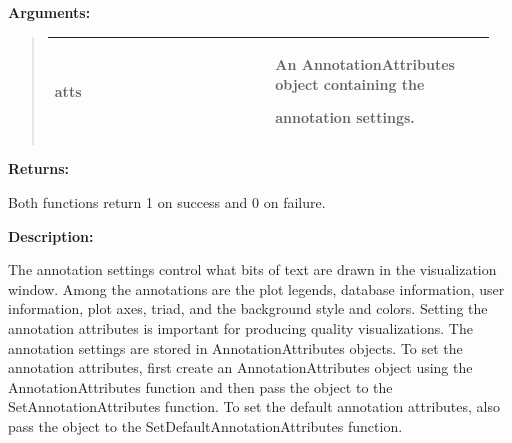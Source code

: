 \documentclass[letterpaper,10pt,english]{sphinxmanual}
\begin{document}
\begin{DUlineblock}{0em}
\item[] 
\item[] \textbf{Arguments:}
\end{DUlineblock}
\begin{quote}

\begin{tabular}{|p{0.475\linewidth}|p{0.475\linewidth}|}
\hline

atts
 & 
\begin{DUlineblock}{0em}
\item[] An AnnotationAttributes object containing the
\item[] annotation settings.
\end{DUlineblock}
\\
\hline\end{tabular}

\end{quote}

\begin{DUlineblock}{0em}
\item[] 
\item[] \textbf{Returns:}
\item[] Both functions return 1 on success and 0 on failure.
\item[] 
\item[] \textbf{Description:}
\item[] The annotation settings control what bits of text are drawn in the
visualization window. Among the annotations are the plot legends, database
information, user information, plot axes, triad, and the background style
and colors. Setting the annotation attributes is important for producing
quality visualizations. The annotation settings are stored in
AnnotationAttributes objects. To set the annotation attributes, first
create an AnnotationAttributes object using the AnnotationAttributes
function and then pass the object to the SetAnnotationAttributes function.
To set the default annotation attributes, also pass the object to the
SetDefaultAnnotationAttributes function.
\end{DUlineblock}

\begin{DUlineblock}{0em}
\item[] 
\end{DUlineblock}
\end{document}
